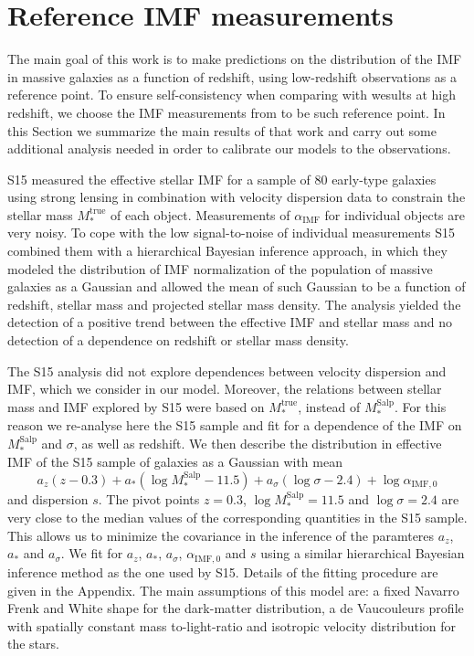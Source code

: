\documentclass[usenatbib]{mnras}
\def\mtrue{M_*^{\mathrm{true}}}
\def\msalp{M_*^{\mathrm{Salp}}}
\def\aimf{\alpha_{\mathrm{IMF}}}
\begin{document}
\section{Reference IMF measurements}\label{sect:obs}

The main goal of this work is to make predictions on the distribution
of the IMF in massive galaxies as a function of redshift, using
low-redshift observations as a reference point. 
To ensure self-consistency when comparing with wesults at high redshift, we choose the IMF measurements from \citet[][hereafter S15]{Son++15} to
be such reference point.
In this Section we summarize the main
results of that work and carry out some additional analysis needed in
order to calibrate our models to the observations.

S15 measured the effective stellar IMF for a sample of 80
early-type galaxies using strong lensing in combination with velocity
dispersion data to constrain the stellar mass $\mtrue$ of each object.
Measurements of $\aimf$ for individual objects are very noisy. To cope
with the low signal-to-noise of individual measurements S15 combined
them with a hierarchical Bayesian inference approach, in which they
modeled the distribution of IMF normalization of the population of
massive galaxies as a Gaussian and allowed the mean of such Gaussian
to be a function of redshift, stellar mass and projected stellar mass
density.  The analysis yielded the detection of a positive trend
between the effective IMF and stellar mass and no detection of a
dependence on redshift or stellar mass density.

The S15 analysis did not explore dependences between velocity dispersion and IMF, which we consider in our model.
Moreover, the relations between stellar mass and IMF explored by S15 were based on $\mtrue$, instead of $\msalp$.
For this reason we re-analyse here the S15 sample and fit for a dependence of the IMF on $\msalp$ and $\sigma$, as well as redshift. We then describe the distribution in effective IMF of the S15 sample of galaxies as a Gaussian with mean
\begin{equation}\label{eq:sl2sfit}
a_z(z - 0.3) + a_*(\log{\msalp} - 11.5) + a_\sigma(\log{\sigma} - 2.4) + \log{\alpha_{\mathrm{IMF},0}}
\end{equation}
and dispersion $s$. 
The pivot points $z=0.3$, $\log{\msalp}=11.5$ and $\log{\sigma}=2.4$ are very close to the median values of the corresponding quantities in the S15 sample. This allows us to minimize the covariance in the inference of the paramteres $a_z$, $a_*$ and $a_\sigma$.
%
We fit for $a_z$,
$a_*$, $a_\sigma$, $\alpha_{\mathrm{IMF},0}$ and $s$ using a similar
hierarchical Bayesian inference method as the one used by S15.
Details of the fitting procedure are given in the Appendix.  The main
assumptions of this model are: a fixed Navarro Frenk and White
\citep[][NFW]{NFW97} shape for the dark-matter distribution, a de Vaucouleurs \citep{deV48} profile with spatially constant
mass to-light-ratio and isotropic velocity distribution
for the stars.  
\end{document}
